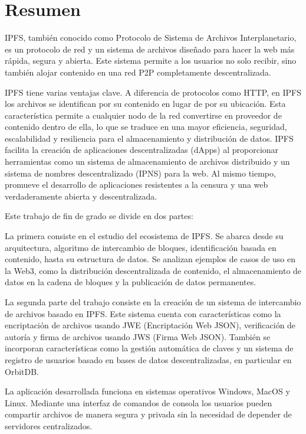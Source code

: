 \chapter*{Resumen}

IPFS, también conocido como Protocolo de Sistema de Archivos Interplanetario, 
es un protocolo de red y un sistema de archivos diseñado para hacer
la web más rápida, segura y abierta. Este sistema permite a los usuarios no 
solo recibir, sino también alojar contenido en una red P2P completamente descentralizada.

IPFS tiene varias ventajas clave. A diferencia de protocolos como HTTP, en IPFS los archivos se identifican 
por su contenido en lugar de por su ubicación. Esta característica permite a cualquier nodo de la red 
convertirse en proveedor de contenido dentro de ella, lo que se traduce en una mayor eficiencia, seguridad, 
escalabilidad y resiliencia para el almacenamiento y distribución de datos.
IPFS facilita la creación de aplicaciones descentralizadas (dApps) al proporcionar herramientas como
un sistema de almacenamiento de archivos distribuido y un sistema de nombres descentralizado (IPNS) para la web. Al mismo tiempo, promueve el desarrollo de aplicaciones resistentes a la censura y una web verdaderamente abierta y descentralizada.

Este trabajo de fin de grado se divide en dos partes:

La primera consiste en el estudio del ecosistema de IPFS. Se abarca desde su arquitectura, algoritmo de intercambio de bloques, 
identificación basada en contenido, hasta su estructura de datos. Se analizan ejemplos de casos de uso en la 
Web3, como la distribución descentralizada de contenido, el almacenamiento de datos en la cadena de bloques y
la publicación de datos permanentes.

La segunda parte del trabajo consiste en la creación de un sistema de intercambio de archivos basado en IPFS. 
Este sistema cuenta con características como la encriptación de archivos usando JWE (Encriptación Web JSON), 
verificación de autoría y firma de archivos usando JWS (Firma Web JSON). También se incorporan características 
como la gestión automática de claves y un sistema de registro de usuarios basado en bases de datos
descentralizadas, en particular en OrbitDB.

La aplicación desarrollada funciona en sistemas operativos Windows, MacOS y Linux. 
Mediante una interfaz de comandos de consola los usuarios pueden compartir archivos de manera segura y privada sin la necesidad de depender de servidores centralizados. 


